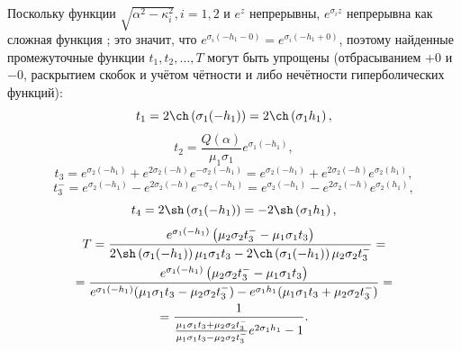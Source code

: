 \documentclass[a4paper, 12pt]{article}
\newcommand{\s}[1]{\sigma_{#1}}
\newcommand{\m}[1]{\mu_{#1}}
\newcommand{\E}[2]{e^{#1 #2}}
\begin{document}
Поскольку функции $\sqrt{\alpha^2-\kappa_i^2}, i=1, 2$ и $e^z$ непрерывны, $\E{\s{i}}{z}$ непрерывна как сложная функция \cite{tfkp, korn};
это значит, что $\E{\s{i}}{(-h_1-0)}=\E{\s{i}}{(-h_1+0)}$, поэтому найденные промежуточные функции $t_1, t_2,\dots, T$ могут быть упрощены (отбрасыванием $+0$ и $-0$, раскрытием скобок и учётом чётности и либо нечётности гиперболических функций):
$$t_1=2\ch \left(\s{1} (-h_1) \right)=2\ch \left(\s{1} h_1 \right),$$
$$t_2=\frac{Q(\alpha)}{\m{1} \s{1}} \E{\s{1}}{(-h_1)},$$
$$t_3=\E{\s{2}}{(-h_1)}+ \E{2\s{2}}{(-h)} \E{-\s{2}}{(-h_1)}=\E{\s{2}}{(-h_1)}+ \E{2\s{2}}{(-h)} \E{\s{2}}{(h_1)},$$
$$t_3^-=\E{\s{2}}{(-h_1)}- \E{2\s{2}}{(-h)} \E{-\s{2}}{(-h_1)}=\E{\s{2}}{(-h_1)}- \E{2\s{2}}{(-h)} \E{\s{2}}{(h_1)},$$
$$t_4=2\sh \left( \s{1} (-h_1)\right)=-2\sh \left( \s{1} h_1\right),$$
\begin{multline}
    T=\frac{\E{\s{1}}{(-h_1)}\left( \m{2}\s{2}t_3^- - \m{1}\s{1}t_3\right)}{2\sh \left( \s{1} (-h_1)\right)\m{1}\s{1}t_3 - 2\ch \left( \s{1} (-h_1)\right)\m{2}\s{2}t_3^-}=\\
    =\frac{\E{\s{1}}{(-h_1)}\left( \m{2}\s{2}t_3^- - \m{1}\s{1}t_3\right)}{\E{\s{1}}{(-h_1)}(\m{1}\s{1}t_3-\m{2}\s{2}t_3^-)-\E{\s{1}}{h_1}(\m{1}\s{1}t_3+\m{2}\s{2}t_3^-)}=\\
    =\frac{1}{\frac{\m{1}\s{1}t_3+\m{2}\s{2}t_3^-}{\m{1}\s{1}t_3-\m{2}\s{2}t_3^-} e^{2\s{1}h_1}-1}.
\end{multline}
\end{document}

